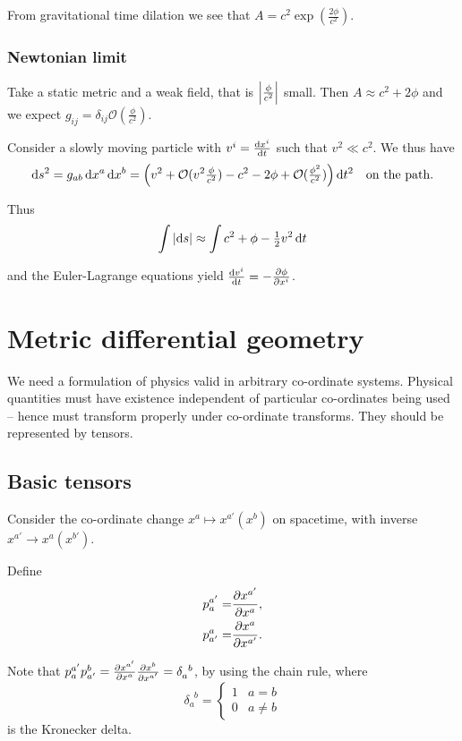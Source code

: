 \documentclass{notes}
\newcommand{\cO}{\mathcal{O}}
\begin{document}
From gravitational time dilation we see that $A = c^2 \exp \left(
\tfrac{2 \phi}{c^2} \right)$.

\subsection{Newtonian limit}

Take a static metric and a weak field, that is $\left|\tfrac{\phi}{c^2}\right|$
small.  Then $A \approx c^2 + 2 \phi$ and we expect
$g_{ij} = \delta_{ij} \cO(\tfrac{\phi}{c^2})$.

Consider a slowly moving particle with $v^i = \frac{\mathrm{d} x^i}{\mathrm{d} t}$ such
that $v^2 \ll c^2$.  We thus have
\[
\ud s^2 = g_{a b}\, \ud x^a\, \ud x^b
= \left(v^2 + \cO(v^2 \tfrac{\phi}{c^2})
- c^2 - 2 \phi + \cO(\tfrac{\phi^2}{c^2}) \right) \ud t^2
\quad \text{on the path.}
\]

Thus
\[
\int \left|\mathrm{d} s\right| \approx \int c^2 + \phi - \tfrac{1}{2} v^2\, \mathrm{d} t
\]

and the Euler-Lagrange equations yield $\frac{\mathrm{d} v^i}{\mathrm{d} t} = - \frac{\partial \phi}{\partial x^i}$.

\chapter{Metric differential geometry}

We need a formulation of physics valid in arbitrary co-ordinate
systems.  Physical quantities must have existence independent of
particular co-ordinates being used -- hence must transform properly
under co-ordinate transforms.  They should be represented by tensors.

\section{Basic tensors}
Consider the co-ordinate change $x^a \mapsto x^{a'}(x^b)$ on spacetime,
with inverse $x^{a'} \to x^a(x^{b'})$.

Define
\begin{align*}
p^{a'}_a =& \frac{\partial x^{a'}}{\partial x^a},\\
p^a_{a'} =& \frac{\partial x^a}{\partial x^{a'}}.
\end{align*}

Note that $p^{a'}_a p^{b}_{a'} = \frac{\partial x^{a'}}{\partial x^a}
\frac{\partial x^b}{\partial x^{a'}} =
\delta^{\phantom{a}b}_a$, by using the chain rule, where
\[
\delta^{\phantom{a}b}_a= \begin{cases} 1 & a=b \\
0& a \neq b \end{cases}
\]
is the Kronecker delta.
\end{document}
